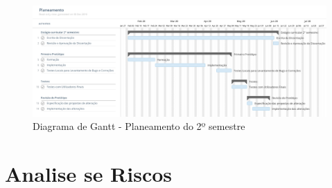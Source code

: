 \begin{figure}[ht!]
	\begin{center}
		\includegraphics[width=1\textwidth]{img/gantt/semestre2.jpeg}
		\caption{Diagrama de Gantt - Planeamento do 2º semestre}
		\label{fig:gantt2}
	\end{center}
\end{figure}

\section{Analise se Riscos}
\label{analiseriscos}
\blankpage

\glsresetall



